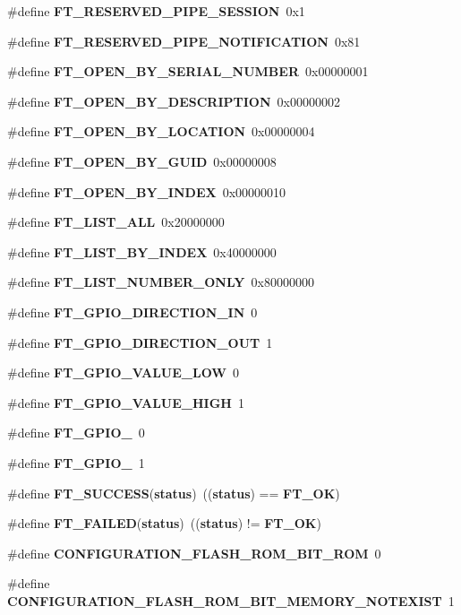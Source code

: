 \begin{DoxyCompactItemize}
\item 
\#define {\bf F\+T\+\_\+\+R\+E\+S\+E\+R\+V\+E\+D\+\_\+\+P\+I\+P\+E\+\_\+\+S\+E\+S\+S\+I\+ON}~0x1
\item 
\#define {\bf F\+T\+\_\+\+R\+E\+S\+E\+R\+V\+E\+D\+\_\+\+P\+I\+P\+E\+\_\+\+N\+O\+T\+I\+F\+I\+C\+A\+T\+I\+ON}~0x81
\item 
\#define {\bf F\+T\+\_\+\+O\+P\+E\+N\+\_\+\+B\+Y\+\_\+\+S\+E\+R\+I\+A\+L\+\_\+\+N\+U\+M\+B\+ER}~0x00000001
\item 
\#define {\bf F\+T\+\_\+\+O\+P\+E\+N\+\_\+\+B\+Y\+\_\+\+D\+E\+S\+C\+R\+I\+P\+T\+I\+ON}~0x00000002
\item 
\#define {\bf F\+T\+\_\+\+O\+P\+E\+N\+\_\+\+B\+Y\+\_\+\+L\+O\+C\+A\+T\+I\+ON}~0x00000004
\item 
\#define {\bf F\+T\+\_\+\+O\+P\+E\+N\+\_\+\+B\+Y\+\_\+\+G\+U\+ID}~0x00000008
\item 
\#define {\bf F\+T\+\_\+\+O\+P\+E\+N\+\_\+\+B\+Y\+\_\+\+I\+N\+D\+EX}~0x00000010
\item 
\#define {\bf F\+T\+\_\+\+L\+I\+S\+T\+\_\+\+A\+LL}~0x20000000
\item 
\#define {\bf F\+T\+\_\+\+L\+I\+S\+T\+\_\+\+B\+Y\+\_\+\+I\+N\+D\+EX}~0x40000000
\item 
\#define {\bf F\+T\+\_\+\+L\+I\+S\+T\+\_\+\+N\+U\+M\+B\+E\+R\+\_\+\+O\+N\+LY}~0x80000000
\item 
\#define {\bf F\+T\+\_\+\+G\+P\+I\+O\+\_\+\+D\+I\+R\+E\+C\+T\+I\+O\+N\+\_\+\+IN}~0
\item 
\#define {\bf F\+T\+\_\+\+G\+P\+I\+O\+\_\+\+D\+I\+R\+E\+C\+T\+I\+O\+N\+\_\+\+O\+UT}~1
\item 
\#define {\bf F\+T\+\_\+\+G\+P\+I\+O\+\_\+\+V\+A\+L\+U\+E\+\_\+\+L\+OW}~0
\item 
\#define {\bf F\+T\+\_\+\+G\+P\+I\+O\+\_\+\+V\+A\+L\+U\+E\+\_\+\+H\+I\+GH}~1
\item 
\#define {\bf F\+T\+\_\+\+G\+P\+I\+O\+\_}~0
\item 
\#define {\bf F\+T\+\_\+\+G\+P\+I\+O\+\_}~1
\item 
\#define {\bf F\+T\+\_\+\+S\+U\+C\+C\+E\+SS}({\bf status})~(({\bf status}) == {\bf F\+T\+\_\+\+OK})
\item 
\#define {\bf F\+T\+\_\+\+F\+A\+I\+L\+ED}({\bf status})~(({\bf status}) != {\bf F\+T\+\_\+\+OK})
\item 
\#define {\bf C\+O\+N\+F\+I\+G\+U\+R\+A\+T\+I\+O\+N\+\_\+\+F\+L\+A\+S\+H\+\_\+\+R\+O\+M\+\_\+\+B\+I\+T\+\_\+\+R\+OM}~0
\item 
\#define {\bf C\+O\+N\+F\+I\+G\+U\+R\+A\+T\+I\+O\+N\+\_\+\+F\+L\+A\+S\+H\+\_\+\+R\+O\+M\+\_\+\+B\+I\+T\+\_\+\+M\+E\+M\+O\+R\+Y\+\_\+\+N\+O\+T\+E\+X\+I\+ST}~1

\end{DoxyCompactItemize}
